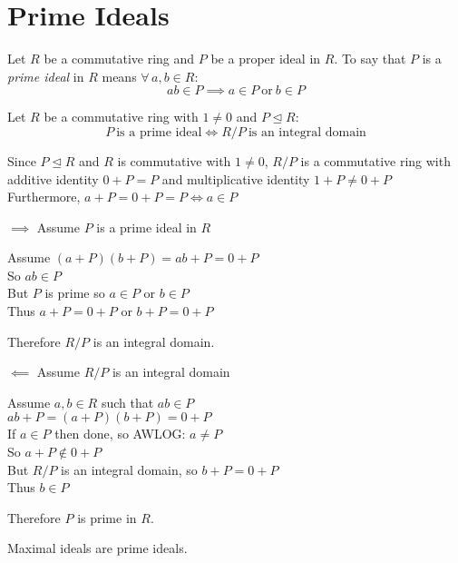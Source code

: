 \documentclass[letterpaper,12pt,fleqn]{article}
\newcommand{\ide}{\trianglelefteq}
\begin{document}
\section*{Prime Ideals}

\begin{definition}[Prime]
  Let $R$ be a commutative ring and $P$ be a proper ideal in $R$. To say that $P$ is
  a \emph{prime ideal} in $R$ means $\forall\,a,b\in R$:
  \[ab\in P\implies a\in P\ \mbox{or}\ b\in P\]
\end{definition}

\begin{theorem}
  Let $R$ be a commutative ring with $1\ne0$ and $P\ide R$:
  \[P\ \mbox{is a prime ideal}\iff R/P\ \mbox{is an integral domain}\]
\end{theorem}

\begin{theproof}
  Since $P\ide R$ and $R$ is commutative with $1\ne0$, $R/P$ is a commutative ring with
  additive identity $0+P=P$ and multiplicative identity $1+P\ne0+P$ \\
  Furthermore, $a+P=0+P=P\iff a\in P$
  \begin{description}
  \item $\implies$ Assume $P$ is a prime ideal in $R$

    Assume $(a+P)(b+P)=ab+P=0+P$ \\
    So $ab\in P$ \\
    But $P$ is prime so $a\in P$ or $b\in P$ \\
    Thus $a+P=0+P$ or $b+P=0+P$
    
    Therefore $R/P$ is an integral domain.

  \item $\impliedby$ Assume $R/P$ is an integral domain

    Assume $a,b\in R$ such that $ab\in P$ \\
    $ab+P=(a+P)(b+P)=0+P$ \\
    If $a\in P$ then done, so AWLOG: $a\ne P$ \\
    So $a+P\notin0+P$ \\
    But $R/P$ is an integral domain, so $b+P=0+P$ \\
    Thus $b\in P$

    Therefore $P$ is prime in $R$.
  \end{description}
\end{theproof}

\begin{corollary}
  Maximal ideals are prime ideals.
\end{corollary}
\end{document}
